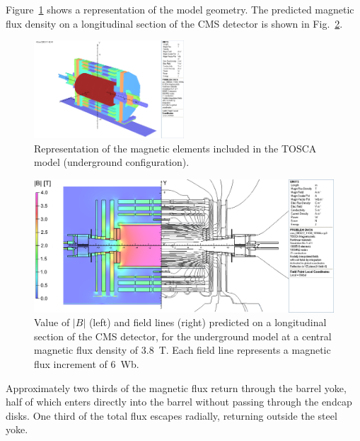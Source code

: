 Figure~\ref{fig:Tosca} shows a representation of the model geometry.
The predicted magnetic flux density  on a longitudinal section of the CMS
detector is shown in Fig.~\ref{fig:FieldLines}.
\begin{figure}
  \begin{center}
    \includegraphics[width=0.5\textwidth,trim=115 0 170 0, clip]{fig/TOSCAVolumes_nologo.png} %
    \caption{Representation of the magnetic elements included
        in the TOSCA model (underground configuration).}
    \label{fig:Tosca}
  \end{center}
\end{figure}
\begin{figure}
  \begin{center}
    \includegraphics[width=\textwidth,trim=0 0 193 0, clip]{fig/lines_6wb3_4_nologo.png}

    \caption{Value of $|B|$ (left) and field lines (right) predicted on
      a longitudinal section of the CMS detector, for the underground
      model at a central magnetic flux density of 3.8~T. Each field
      line represents a magnetic flux increment of 6~Wb.}
    \label{fig:FieldLines}
  \end{center}
\end{figure}
 Approximately two
thirds of the magnetic flux return through the barrel yoke, half of which
enters directly into the barrel without passing through the endcap disks.
One third of the total flux escapes radially, returning outside the
steel yoke.
